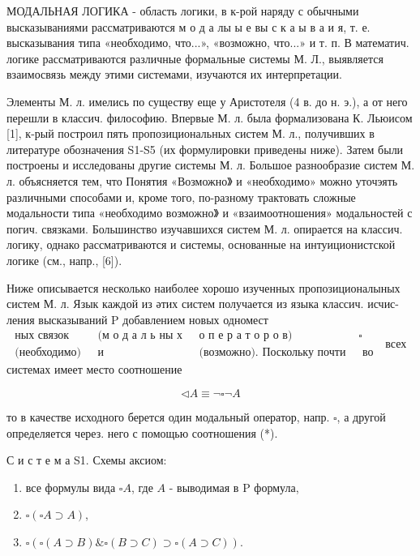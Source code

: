 \documentclass[10pt]{article}
\begin{document}
МОДАЛЬНАЯ ЛОГИКА - область логики, в к-рой наряду с обычными высказываниями рассматриваются м о д а лы ы е вы с к а ы в а и я, т. е. высказывания типа «необходимо, что...», «возможно, что...» и т. п. В математич. логике рассматриваются различные формальные системы М. Л., выявляется взаимосвязь между этими системами, изучаются их интерпретации.



Элементы М. л. имелись по существу еще у Аристотеля (4 в. до н. э.), а от него перешли в классич. философию. Впервые М. л. была формализована К. Льюисом [1], к-рый построил пять пропозициональных систем М. л., получивших в литературе обозначения S1-S5 (их формулировки приведены ниже). Затем были построены и исследованы другие системы М. л. Большое разнообразие систем М. л. объясняется тем, что Понятия «Возможно》 и «необходимо» можно уточэять различными способами и, кроме того, по-разному трактовать сложные модальности типа «необходимо возможно》 и «взаимоотношения» модальностей с погич. связками. Большинство изучавшихся систем М. л. опирается на классич. логику, однако рассматриваются и системы, основанные на интуиционистской логике (см., напр., [6]).



Ниже описывается несколько наиболее хорошо изученных пропозиционалыных систем М. л. Язык каждой из әтих систем получается из языка классич. исчис- ления высказываний $\mathrm{P}$ добавлением новых одномест$\begin{array}{llllll}\text { ных связок } & \text { (м о д а л ь ны х } & \text { о п е р а т о р о в) } & \square \\ \text { (необходимо) } & \text { и } & \text { (возможно). Поскольку почти } & \text { во }\end{array}$ всех системах имеет место соотношение



\[

\triangleleft A \equiv \neg \square \neg A

\]



то в качестве исходного берется один модальный оператор, напр. $\square$, а другой определяется через. него с помощью соотношения (*).



С и с т е м а S1. Схемы аксиом:



\begin{enumerate}

  \item все формулы вида $\square A$, где $A$ - выводимая в $\mathrm{P}$ формула,



  \item $\square(\square A \supset A)$,



  \item $\square(\square(A \supset B) \& \square(B \supset C) \supset \square(A \supset C))$.



\end{enumerate}
\end{document}
